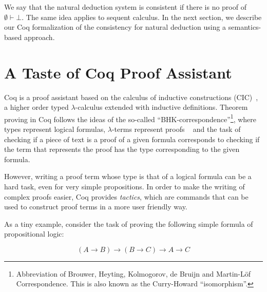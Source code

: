 We say that the natural deduction system is consistent if there is no proof of $\emptyset\vdash \bot$. The same idea applies to sequent calculus.
In the next section, we describe our Coq formalization of the consistency for natural deduction using a semantics-based approach.


\section{A Taste of Coq Proof Assistant}\label{sec:coq}


Coq is a proof assistant based on the calculus of inductive
constructions (CIC)~\cite{Bertot04}, a higher order typed
$\lambda$-calculus extended with inductive definitions.  Theorem
proving in Coq follows the ideas of the so-called
``BHK-correspondence''\footnote{Abbreviation of Brouwer, Heyting,
  Kolmogorov, de Bruijn and Martin-L\"of Correspondence. This is also
  known as the Curry-Howard ``isomorphism''.}, where types represent
logical formulas, $\lambda$-terms represent proofs
~\cite{Sorensen06} and the task of checking if a piece of text is a
proof of a given formula corresponds to checking if the term that
represents the proof has the type corresponding to the given formula.


However, writing a proof term whose type is that of a logical formula
can be a hard task, even for very simple propositions.  In order to
make the writing of complex proofs easier, Coq provides
\emph{tactics}, which are commands that can be used to construct proof
terms in a more user friendly way.


As a tiny example, consider the task of proving the following simple
formula of propositional logic:

\[
(A \to B)\to (B\to C) \to A \to C
\]

